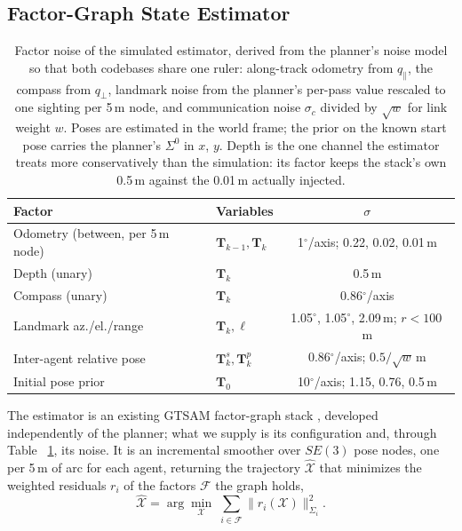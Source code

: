 \documentclass[letterpaper, 10 pt, conference]{ieeeconf}
\theoremstyle{remark}
\begin{document}
\subsection{Factor-Graph State Estimator}

\begin{table}[t]
      \centering
  \scriptsize
  \setlength{\tabcolsep}{3pt}
  \begin{tabular}{@{}llc@{}}
    \toprule
    Factor & Variables & $\sigma$ \\
    \midrule
    Odometry (between, per 5\,m node) & $\mathbf T_{k-1},\mathbf T_k$ & 1$^\circ$/axis; 0.22, 0.02, 0.01\,m \\
    Depth (unary) & $\mathbf T_k$ & 0.5\,m \\
    Compass (unary) & $\mathbf T_k$ & 0.86$^\circ$/axis \\
    Landmark az./el./range & $\mathbf T_k,\ell$ & 1.05$^\circ$, 1.05$^\circ$, 2.09\,m; $r<100$\,m \\
    Inter-agent relative pose & $\mathbf T^{s}_k,\mathbf T^{p}_k$ & 0.86$^\circ$/axis; $0.5/\sqrt{w}$\,m \\
    Initial pose prior & $\mathbf T_0$ & 10$^\circ$/axis; 1.15, 0.76, 0.5\,m \\
    \bottomrule
  \end{tabular}
  \caption{Factor noise of the simulated estimator, derived from the planner's
    noise model so that both codebases share one ruler: along-track odometry
    from $q_\parallel$, the compass from $q_\perp$, landmark noise from the
    planner's per-pass value rescaled to one sighting per 5\,m node, and
    communication noise $\sigma_c$ divided by $\sqrt{w}$ for link weight $w$.
    Poses are estimated in the world frame; the prior on the known start pose
    carries the planner's $\Sigma^0$ in $x$, $y$.
    Depth is the one channel the estimator treats more conservatively than
    the simulation: its factor keeps the stack's own 0.5\,m against the
    0.01\,m actually injected.}
  \label{tab:noise}
\end{table}

The estimator is an existing GTSAM factor-graph stack
\cite{kaess2012isam2,dellaert2017factor}, developed independently of the
planner; what we supply is its configuration and, through Table~
\ref{tab:noise}, its noise. It is an incremental smoother
\cite{kaess2012isam2} over $SE(3)$ pose nodes, one per 5\,m of arc for each
agent, returning the trajectory $\hat{\mathcal X}$ that minimizes the weighted
residuals $r_i$ of the factors $\mathcal F$ the graph holds,
\begin{equation}
  \hat{\mathcal X}=\arg\min_{\mathcal X}\;\sum_{i\in\mathcal F}
    \big\lVert r_i(\mathcal X)\big\rVert^{2}_{\Sigma_i}.
  \label{eq:fg}
\end{equation}
\end{document}

